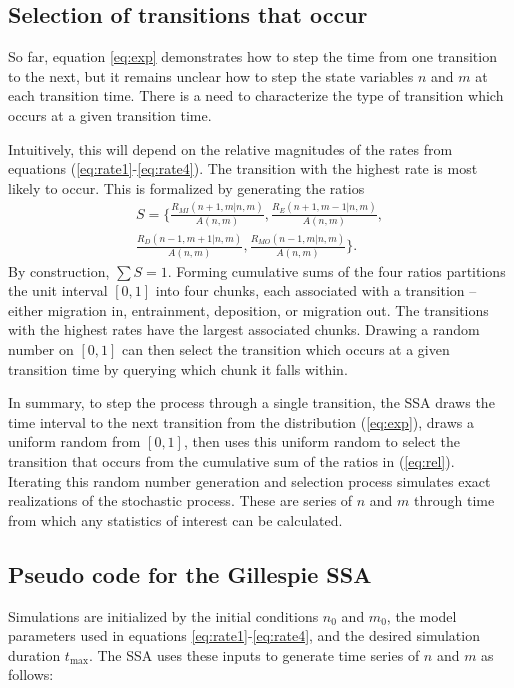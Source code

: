 \subsection{Selection of transitions that occur}

So far, equation \ref{eq:exp} demonstrates how to step the time from one transition to the next, but it remains unclear how to step the state variables $n$ and $m$ at each transition time. There is a need to characterize the type of transition which occurs at a given transition time.

Intuitively, this will depend on the relative magnitudes of the rates from equations (\ref{eq:rate1}-\ref{eq:rate4}).
The transition with the highest rate is most likely to occur.
This is formalized by generating the ratios
\begin{multline} S = \Bigg\{\frac{R_{MI}(n+1,m|n,m)}{ A(n,m)},
	\frac{R_E(n+1,m-1|n,m)}{ A(n,m)},\\
	\frac{R_D(n-1,m+1|n,m)}{ A(n,m)},
	\frac{R_{MO}(n-1,m|n,m)}{ A(n,m)}\Bigg\}. \label{eq:rel} \end{multline}
By construction, $\sum S=1$.
Forming cumulative sums of the four ratios partitions the unit interval $[0,1]$ into four chunks, each associated with a transition -- either migration in, entrainment, deposition, or migration out. The transitions with the highest rates have the largest associated chunks. Drawing a random number on $[0,1]$ can then select the transition which occurs at a given transition time by querying which chunk it falls within.

In summary, to step the process through a single transition, the SSA draws the time interval to the next transition from the distribution (\ref{eq:exp}), draws a uniform random from $[0,1]$, then uses this uniform random to select the transition that occurs from the cumulative sum of the ratios in (\ref{eq:rel}). Iterating this random number generation and selection process simulates exact realizations of the stochastic process. These are series of $n$ and $m$ through time from which any statistics of interest can be calculated.

\subsection{Pseudo code for the Gillespie SSA}

Simulations are initialized by the initial conditions $n_0$ and $m_0$, the model parameters used in equations \ref{eq:rate1}-\ref{eq:rate4}, and the desired simulation duration $t_\text{max}$. The SSA uses these inputs to generate time series of $n$ and $m$ as follows:

